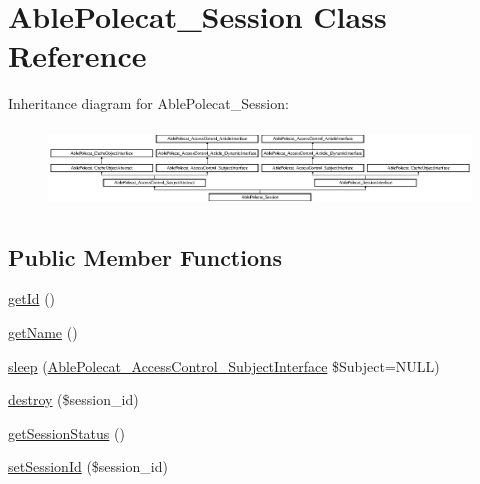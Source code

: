 \hypertarget{class_able_polecat___session}{}\section{Able\+Polecat\+\_\+\+Session Class Reference}
\label{class_able_polecat___session}
Inheritance diagram for Able\+Polecat\+\_\+\+Session\+:\begin{figure}[H]
\begin{center}
\leavevmode
\includegraphics[height=2.134146cm]{class_able_polecat___session}
\end{center}
\end{figure}
\subsection*{Public Member Functions}
\begin{DoxyCompactItemize}
\item 
\hyperlink{class_able_polecat___session_a12251d0c022e9e21c137a105ff683f13}{get\+Id} ()
\item 
\hyperlink{class_able_polecat___session_a3d0963e68bb313b163a73f2803c64600}{get\+Name} ()
\item 
\hyperlink{class_able_polecat___session_a365e24d7b066205cafa2a5cce3a4f224}{sleep} (\hyperlink{interface_able_polecat___access_control___subject_interface}{Able\+Polecat\+\_\+\+Access\+Control\+\_\+\+Subject\+Interface} \$Subject=N\+U\+L\+L)
\item 
\hyperlink{class_able_polecat___session_aaec5812f6b4eb6835f88d3baa06a002a}{destroy} (\$session\+\_\+id)
\item 
\hyperlink{class_able_polecat___session_a4f9d8c32820bd2ece69d36d4375baa6b}{get\+Session\+Status} ()
\item 
\hyperlink{class_able_polecat___session_a89c236b6e327f2fe058c4a7b32a10f9d}{set\+Session\+Id} (\$session\+\_\+id)
\end{DoxyCompactItemize}
